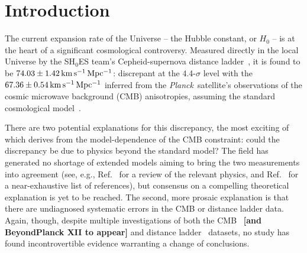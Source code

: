 \documentclass[%
 reprint,
 superscriptaddress,
 nofootinbib,
 amsmath,amssymb,
 aps,
]{revtex4-2}
\newcommand{\kmsmpc}{\ensuremath{{\rm km\,s^{-1}\,Mpc^{-1}}}}
\newcommand{\planck}{{\it Planck}}
\begin{document}

\maketitle


\section{Introduction} \label{sec:intro}


The current expansion rate of the Universe -- the Hubble constant, or $H_0$ -- is at the heart of a significant cosmological controversy. Measured directly in the local Universe by the SH$_0$ES team's Cepheid-supernova distance ladder~\cite{Riess_etal:2019}, it is found to be $74.03 \pm 1.42 \,\kmsmpc$: discrepant at the 4.4-$\sigma$ level with the $67.36 \pm 0.54\,\kmsmpc$ inferred from the \planck\ satellite's observations of the cosmic microwave background (CMB) anisotropies, assuming the standard cosmological model~\cite{Planck_VI:2018}.

There are two potential explanations for this discrepancy, the most exciting of which derives from the model-dependence of the CMB constraint: could the discrepancy be due to physics beyond the standard model? The field has generated no shortage of extended models aiming to bring the two measurements into agreement (see, e.g., Ref.~\cite{Knox_Millea:2020} for a review of the relevant physics, and Ref.~\cite{Vagnozzi:2020} for a near-exhaustive list of references), but consensus on a compelling theoretical explanation is yet to be reached. The second, more prosaic explanation is that there are undiagnosed systematic errors in the CMB or distance ladder data. Again, though, despite multiple investigations of both the CMB~\cite{Spergel_etal:2015,Addison_etal:2016,Obied_etal:2017,Calabrese_etal:2017,Efstathiou_Gratton:2019,Motloch_Hu:2020,ACT:2020} {\bf [and BeyondPlanck XII to appear]} and distance ladder~\cite{Efstathiou:2014,Rigault_etal:2015,Jones_etal:2015,Cardona_etal:2016,Zhang_etal:2017,Follin_Knox:2017,Feeney_etal:2017,Wu_Huterer:2017,Dhawan_etal:2017,Bengaly_etal:2018,Rigault_etal:2018,Jones_etal:2018,Riess_etal:2020,Efstathiou:2020} datasets, no study has found incontrovertible evidence warranting a change of conclusions.
\end{document}
